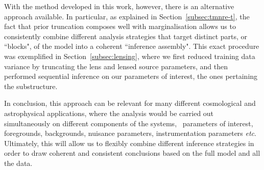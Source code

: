 With the method developed in this work, however, there is an alternative approach available. In particular, as explained in Section~\ref{subsec:tmnre-t}, the fact that prior truncation composes well with marginalisation allows us to consistently combine different analysis strategies that target distinct parts, or ``blocks", of the model into a coherent ``inference assembly". This exact procedure was exemplified in Section~\ref{subsec:lensing}, where we first reduced training data variance by truncating the lens and lensed source parameters, and then performed sequential inference on our parameters of interest, the ones pertaining the substructure.

In conclusion, this approach can be relevant for many different cosmological and astrophysical applications, where the analysis would be carried out simultaneously on different components of the systems, \eg~parameters of interest, foregrounds, backgrounds, nuisance parameters, instrumentation parameters \textit{etc}. Ultimately, this will allow us to flexibly combine different inference strategies in order to draw coherent and consistent conclusions based on the full model and all the data.

%



